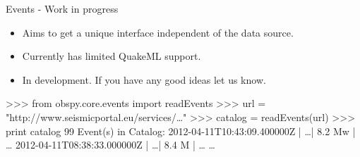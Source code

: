 \begin{frame}{Events - Work in progress}
    \begin{itemize}
        \item Aims to get a unique interface independent of the data source.
        \item Currently has limited QuakeML support.
        \item In development. If you have any good ideas let us know.
    \end{itemize}
\begin{myColorBox}{0.95}{}
\begin{semiverbatim}
>>> from obspy.core.events import readEvents
>>> url = "http://www.seismicportal.eu/services/\dots"
>>> catalog = readEvents(url)
>>> print catalog
99 Event(s) in Catalog:
2012-04-11T10:43:09.400000Z |  \dots | 8.2 Mw | \dots
2012-04-11T08:38:33.000000Z |  \dots | 8.4 M  | \dots
\dots
\end{semiverbatim}
\end{myColorBox}
\end{frame}





